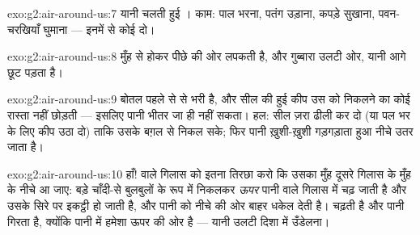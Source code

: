 \begin{solution}{exo:g2:air-around-us:7}
 यानी चलती हुई । काम: पाल भरना, पतंग उड़ाना, कपड़े सुखाना,
पवन-चरखियाँ घुमाना --- इनमें से कोई दो।
\end{solution}

\begin{solution}{exo:g2:air-around-us:8}
 मुँह से होकर पीछे की ओर लपकती है, और गुब्बारा उलटी ओर, यानी आगे
छूट पड़ता है।
\end{solution}

\begin{solution}{exo:g2:air-around-us:9}
बोतल पहले से  से भरी है, और सील की हुई कीप उस  को निकलने का
कोई रास्ता नहीं छोड़ती --- इसलिए पानी भीतर जा ही नहीं सकता। हल: सील
ज़रा ढीली कर दो (या पल भर के लिए कीप उठा दो) ताकि  उसके बग़ल से
निकल सके; फिर पानी ख़ुशी-ख़ुशी गड़गड़ाता हुआ नीचे उतर जाता है।
\end{solution}

\begin{solution}{exo:g2:air-around-us:10}
हाँ!  वाले गिलास को इतना तिरछा करो कि उसका मुँह दूसरे गिलास के
मुँह के नीचे आ जाए:  बड़े चाँदी-से बुलबुलों के रूप में निकलकर
\emph{ऊपर} पानी वाले गिलास में चढ़ जाती है और उसके सिरे पर इकट्ठी हो
जाती है, और पानी को नीचे की ओर बाहर धकेल देती है।  चढ़ती है और
पानी गिरता है, क्योंकि  पानी में हमेशा ऊपर की ओर  है ---
यानी उलटी दिशा में उँडेलना।
\end{solution}
